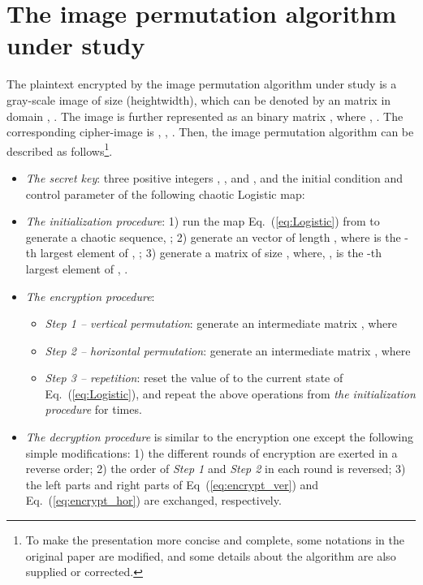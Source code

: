 \documentclass[3p,preprint,11pt]{elsarticle}
\begin{document}
\section{The image permutation algorithm under study}
\label{sec:encryptscheme}

The plaintext encrypted by the image permutation algorithm under
study is a gray-scale image of size 
(heightwidth), which can be denoted by an  matrix
in domain , . The image  is further represented as an  binary matrix , where
, . The
corresponding cipher-image is , , .
Then, the image permutation algorithm can be described as
follows\footnote{To make the presentation more concise and complete,
some notations in the original paper are modified, and some details
about the algorithm are also supplied or corrected.}.

\begin{itemize}
\item \textit{The secret key}: three positive integers , , and , and
the initial condition  and control parameter  of the following chaotic Logistic map:


\item \textit{The initialization procedure}: 1) run the map Eq.~(\ref{eq:Logistic})
from  to generate a chaotic sequence,
; 2) generate an vector
 of length , where  is the
-th largest element of ,
; 3) generate a matrix  of size
, where,  ,
 is the -th largest element of
 , .

\item \textit{The encryption procedure}:

\begin{itemize}
\item \textit{Step 1 -- vertical permutation}: generate an intermediate matrix
, where


\item \textit{Step 2 -- horizontal permutation}: generate an intermediate matrix
, where


\item \textit{Step 3 -- repetition}: reset the value of  to the current state of Eq.~(\ref{eq:Logistic}), and repeat
the above operations from \textit{the initialization procedure} for  times.
\end{itemize}

\item \textit{The decryption procedure} is similar to the encryption one except the following simple modifications:
1) the different rounds of encryption are exerted in a reverse order; 2) the order of \textit{Step 1} and \textit{Step 2}
in each round is reversed; 3) the left parts and right parts of Eq~(\ref{eq:encrypt_ver}) and Eq.~(\ref{eq:encrypt_hor})
are exchanged, respectively.
\end{itemize}
\end{document}
